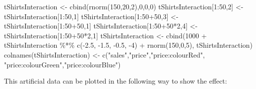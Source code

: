 \documentclass[
]{book}
\newenvironment{Shaded}{\begin{snugshade}}{\end{snugshade}}
\newcommand{\DecValTok}[1]{\textcolor[rgb]{0.00,0.00,0.81}{#1}}
\newcommand{\FloatTok}[1]{\textcolor[rgb]{0.00,0.00,0.81}{#1}}
\newcommand{\FunctionTok}[1]{\textcolor[rgb]{0.00,0.00,0.00}{#1}}
\newcommand{\NormalTok}[1]{#1}
\newcommand{\OtherTok}[1]{\textcolor[rgb]{0.56,0.35,0.01}{#1}}
\newcommand{\SpecialCharTok}[1]{\textcolor[rgb]{0.00,0.00,0.00}{#1}}
\newcommand{\StringTok}[1]{\textcolor[rgb]{0.31,0.60,0.02}{#1}}
\theoremstyle{definition}
\theoremstyle{definition}
\theoremstyle{definition}
\theoremstyle{definition}
\theoremstyle{remark}
\begin{document}
\begin{Shaded}
\begin{Highlighting}[]
\NormalTok{tShirtsInteraction }\OtherTok{\textless{}{-}} \FunctionTok{cbind}\NormalTok{(}\FunctionTok{rnorm}\NormalTok{(}\DecValTok{150}\NormalTok{,}\DecValTok{20}\NormalTok{,}\DecValTok{2}\NormalTok{),}\DecValTok{0}\NormalTok{,}\DecValTok{0}\NormalTok{,}\DecValTok{0}\NormalTok{)}
\NormalTok{tShirtsInteraction[}\DecValTok{1}\SpecialCharTok{:}\DecValTok{50}\NormalTok{,}\DecValTok{2}\NormalTok{] }\OtherTok{\textless{}{-}}\NormalTok{ tShirtsInteraction[}\DecValTok{1}\SpecialCharTok{:}\DecValTok{50}\NormalTok{,}\DecValTok{1}\NormalTok{]}
\NormalTok{tShirtsInteraction[}\DecValTok{1}\SpecialCharTok{:}\DecValTok{50}\SpecialCharTok{+}\DecValTok{50}\NormalTok{,}\DecValTok{3}\NormalTok{] }\OtherTok{\textless{}{-}}\NormalTok{ tShirtsInteraction[}\DecValTok{1}\SpecialCharTok{:}\DecValTok{50}\SpecialCharTok{+}\DecValTok{50}\NormalTok{,}\DecValTok{1}\NormalTok{]}
\NormalTok{tShirtsInteraction[}\DecValTok{1}\SpecialCharTok{:}\DecValTok{50}\SpecialCharTok{+}\DecValTok{50}\SpecialCharTok{*}\DecValTok{2}\NormalTok{,}\DecValTok{4}\NormalTok{] }\OtherTok{\textless{}{-}}\NormalTok{ tShirtsInteraction[}\DecValTok{1}\SpecialCharTok{:}\DecValTok{50}\SpecialCharTok{+}\DecValTok{50}\SpecialCharTok{*}\DecValTok{2}\NormalTok{,}\DecValTok{1}\NormalTok{]}
\NormalTok{tShirtsInteraction }\OtherTok{\textless{}{-}} \FunctionTok{cbind}\NormalTok{(}\DecValTok{1000} \SpecialCharTok{+}\NormalTok{ tShirtsInteraction }\SpecialCharTok{\%*\%} \FunctionTok{c}\NormalTok{(}\SpecialCharTok{{-}}\FloatTok{2.5}\NormalTok{, }\SpecialCharTok{{-}}\FloatTok{1.5}\NormalTok{, }\SpecialCharTok{{-}}\FloatTok{0.5}\NormalTok{, }\SpecialCharTok{{-}}\DecValTok{4}\NormalTok{) }\SpecialCharTok{+}
                              \FunctionTok{rnorm}\NormalTok{(}\DecValTok{150}\NormalTok{,}\DecValTok{0}\NormalTok{,}\DecValTok{5}\NormalTok{), tShirtsInteraction)}
\FunctionTok{colnames}\NormalTok{(tShirtsInteraction) }\OtherTok{\textless{}{-}} \FunctionTok{c}\NormalTok{(}\StringTok{"sales"}\NormalTok{,}\StringTok{"price"}\NormalTok{,}\StringTok{"price:colourRed"}\NormalTok{,}
                                  \StringTok{"price:colourGreen"}\NormalTok{,}\StringTok{"price:colourBlue"}\NormalTok{)}
\end{Highlighting}
\end{Shaded}

This artificial data can be plotted in the following way to show the effect:
\end{document}
